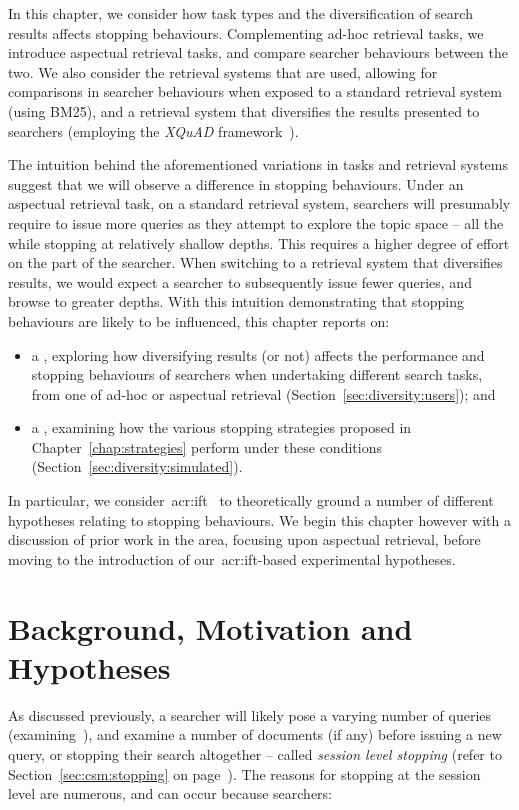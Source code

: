 In this chapter, we consider how task types and the diversification of search results affects stopping behaviours. Complementing ad-hoc retrieval tasks, we introduce aspectual retrieval tasks, and compare searcher behaviours between the two. We also consider the retrieval systems that are used, allowing for comparisons in searcher behaviours when exposed to a standard retrieval system (using BM25), and a retrieval system that diversifies the results presented to searchers (employing the \emph{XQuAD} framework~\citep{santos2010query_reformulations_diversification}).

The intuition behind the aforementioned variations in tasks and retrieval systems suggest that we will observe a difference in stopping behaviours. Under an aspectual retrieval task, on a standard retrieval system, searchers will presumably require to issue more queries as they attempt to explore the topic space -- all the while stopping at relatively shallow depths. This requires a higher degree of effort on the part of the searcher. When switching to a retrieval system that diversifies results, we would expect a searcher to subsequently issue fewer queries, and browse to greater depths. With this intuition demonstrating that stopping behaviours are likely to be influenced, this chapter reports on:

\begin{itemize}
    \item{a , exploring how diversifying results (or not) affects the performance and stopping behaviours of searchers when undertaking different search tasks, from one of ad-hoc or aspectual retrieval (Section~\ref{sec:diversity:users}); and}
    \item{a , examining how the various stopping strategies proposed in Chapter~\ref{chap:strategies} perform under these conditions (Section~\ref{sec:diversity:simulated}).}
\end{itemize}

In particular, we consider~\gls{acr:ift}~\citep{pirolli1999ift} to theoretically ground a number of different hypotheses relating to stopping behaviours. We begin this chapter however with a discussion of prior work in the area, focusing upon aspectual retrieval, before moving to the introduction of our~\gls{acr:ift}-based experimental hypotheses.

\section{Background, Motivation and Hypotheses}\label{sec:diversity:background}
As discussed previously, a searcher will likely pose a varying number of queries (examining~), and examine a number of documents (if any) before issuing a new query, or stopping their search altogether -- called \emph{session level stopping} (refer to Section~\ref{sec:csm:stopping} on page~\pageref{sec:csm:stopping}). The reasons for stopping at the session level are numerous, and can occur because searchers:

